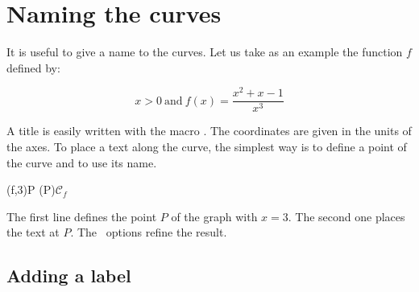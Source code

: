 \section{Naming the curves}

It is useful to give a name to the curves. Let us take as an example the function $f$ defined by:

\[
   x>0\ \text{and}\ f(x)=\dfrac{x^2+x-1}{x^3}
\]

A title is easily written with the macro . The coordinates are given in the units of the axes. To place a text along the curve, the simplest way is to define a point of the curve and to use its name.

\begin{tkzltxexample}[num]
  \tkzFnDefPoint(f,3){P}
  (P){${\mathcal{C}}_f$}
\end{tkzltxexample}

The first line defines the point $P$ of the graph with $x=3$. The second one places the text at $P$. The \TIKZ\ options refine the result.

\subsection{Adding a label}

\begin{center}
\begin{tkzexample}[vbox]
\end{tkzexample}
\end{center}

\endinput
